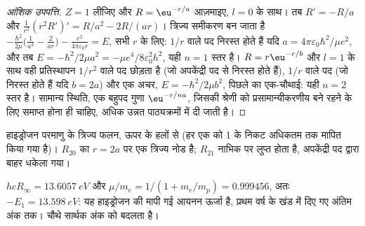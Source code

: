 \begin{proof}[आंशिक उपपत्ति]
$Z = 1$ लीजिए और $R = \eu^{-r/a}$ आज़माइए, $l = 0$ के साथ। तब $R' = -R/a$ और
$\frac{1}{r^2}(r^2R')' = R/a^2 - 2R/(ar)$। त्रिज्य समीकरण बन जाता है
$-\frac{\hbar^2}{2\mu}\big(\frac{1}{a^2} - \frac{2}{ar}\big) - \frac{e^2}{4\pi
\varepsilon_0r} = E$, सभी $r$ के लिए: $1/r$ वाले पद निरस्त होते हैं यदि $a =
4\pi\varepsilon_0\hbar^2/\mu e^2$, और तब $E = -\hbar^2/2\mu a^2 = -\mu
e^4/8\varepsilon_0^2h^2$, यही $n = 1$ स्तर है। $R = r\eu^{-r/b}$ और $l = 1$ के साथ
वही प्रतिस्थापन $1/r^2$ वाले पद छोड़ता है (जो
अपकेंद्री पद से निरस्त होते हैं), $1/r$ वाले पद (जो निरस्त होते हैं यदि $b = 2a$) और एक अचर, $E =
-\hbar^2/2\mu b^2$, पिछले का एक-चौथाई: यही $n = 2$ स्तर है। सामान्य
स्थिति, एक बहुपद गुणा $\eu^{-r/na}$, जिसकी श्रेणी को प्रसामान्यीकरणीय बने रहने
के लिए समाप्त होना ही चाहिए, अधिक उन्नत पाठ्यक्रमों में दी जाती है।
\end{proof}

\begin{omfigure}

{\small हाइड्रोजन परमाणु के त्रिज्य फलन, ऊपर के हलों से
(हर एक को 1 के निकट अधिकतम तक मापित किया गया है)। $R_{20}$ का $r = 2a$ पर एक त्रिज्य नोड है;
$R_{21}$ नाभिक पर लुप्त होता है, अपकेंद्री पद द्वारा बाहर धकेला गया।}
\end{omfigure}

\begin{example}[हाइड्रोजन की आयनन ऊर्जा]\label{ex:b3:quantum-model-systems:ie}
$hcR_\infty = \qty{13.6057}{eV}$ और $\mu/m_e = 1/(1 + m_e/m_p) = 0.999456$, अतः
$-E_1 = \qty{13.598}{eV}$: यह हाइड्रोजन की मापी गई आयनन ऊर्जा है, प्रथम वर्ष के
खंड में दिए गए अंतिम अंक तक।  चौथे
सार्थक अंक को बदलता है।
\end{example}

